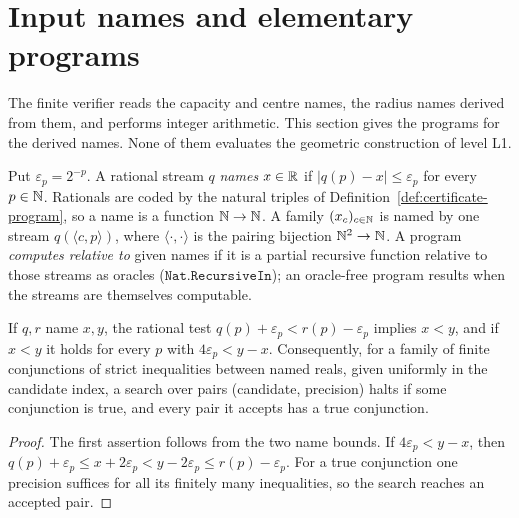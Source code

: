 \section{Input names and elementary programs}\label{sec:efd}

The finite verifier reads the capacity and centre names, the radius names derived from them, and performs integer
arithmetic. This section gives the programs for the derived names. None of them evaluates the geometric
construction of level L1.

\begin{definition}[Names]\label{def:efd-interface}
Put $\varepsilon_p=2^{-p}$. A rational stream $q$ \emph{names} $x\in\mathbb{R}$ if $|q(p)-x|\le\varepsilon_p$ for every
$p\in\mathbb{N}$. Rationals are coded by the natural triples of Definition~\ref{def:certificate-program}, so a name is a
function $\mathbb{N}\to\mathbb{N}$. A family $(x_c)_{c\in\mathbb{N}}$ is named by one stream $q(\langle c,p\rangle)$, where
$\langle\cdot,\cdot\rangle$ is the pairing bijection $\mathbb{N}^2\to\mathbb{N}$. A program \emph{computes relative to} given names if
it is a partial recursive function relative to those streams as oracles ($\mathtt{Nat.RecursiveIn}$); an
oracle-free program results when the streams are themselves computable.
\end{definition}

\begin{lemma}\label{lem:efd-search}
If $q,r$ name $x,y$, the rational test $q(p)+\varepsilon_p<r(p)-\varepsilon_p$ implies $x<y$, and if $x<y$ it holds
for every $p$ with $4\varepsilon_p<y-x$. Consequently, for a family of finite conjunctions of strict inequalities
between named reals, given uniformly in the candidate index, a search over pairs (candidate, precision) halts if
some conjunction is true, and every pair it accepts has a true conjunction.
\end{lemma}

\begin{proof}
The first assertion follows from the two name bounds. If $4\varepsilon_p<y-x$, then
$q(p)+\varepsilon_p\le x+2\varepsilon_p<y-2\varepsilon_p\le r(p)-\varepsilon_p$. For a true conjunction one precision
suffices for all its finitely many inequalities, so the search reaches an accepted pair.
\end{proof}


